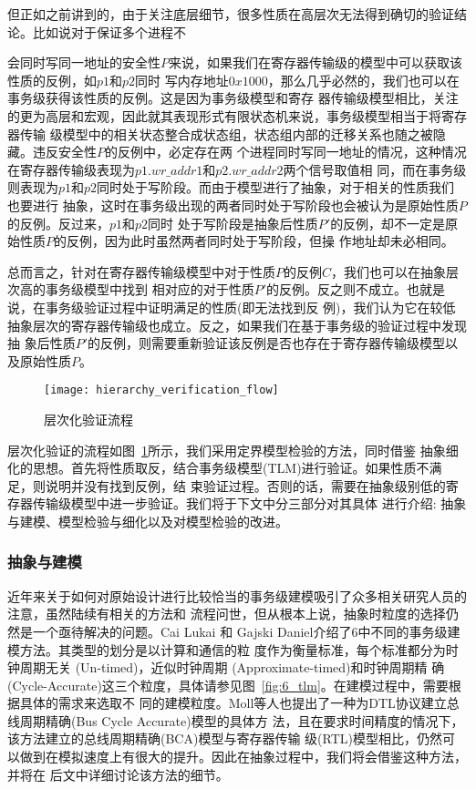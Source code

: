 但正如之前讲到的，由于关注底层细节，很多性质在高层次无法得到确切的验证结论。比如说对于保证多个进程不

 会同时写同一地址的安全性$P$来说，如果我们在寄存器传输级的模型中可以获取该性质的反例，如$p1$和$p2$同时
写内存地址$0x1000$，那么几乎必然的，我们也可以在事务级获得该性质的反例。这是因为事务级模型和寄存
器传输级模型相比，关注的更为高层和宏观，因此就其表现形式有限状态机来说，事务级模型相当于将寄存器传输
级模型中的相关状态整合成状态组，状态组内部的迁移关系也随之被隐藏。违反安全性$P$的反例中，必定存在两
个进程同时写同一地址的情况，这种情况在寄存器传输级表现为$p1.wr\_addr1$和$p2.wr\_addr2$两个信号取值相
同，而在事务级则表现为$p1$和$p2$同时处于写阶段。而由于模型进行了抽象，对于相关的性质我们也要进行
抽象，这时在事务级出现的两者同时处于写阶段也会被认为是原始性质$P$的反例。反过来，$p1$和$p2$同时
处于写阶段是抽象后性质$P'$的反例，却不一定是原始性质$P$的反例，因为此时虽然两者同时处于写阶段，但操
作地址却未必相同。

总而言之，针对在寄存器传输级模型中对于性质$P$的反例$C$，我们也可以在抽象层次高的事务级模型中找到
相对应的对于性质$P'$的反例。反之则不成立。也就是说，在事务级验证过程中证明满足的性质(即无法找到反
例)，我们认为它在较低抽象层次的寄存器传输级也成立。反之，如果我们在基于事务级的验证过程中发现抽
象后性质$P'$的反例，则需要重新验证该反例是否也存在于寄存器传输级模型以及原始性质$P$。

\begin{figure}[ht]
\centering
\texttt{[image: hierarchy\_verification\_flow]}
\caption{层次化验证流程}
\label{fig:hierarchy_verification_flow}
\end{figure} 

层次化验证的流程如图~\ref{fig:hierarchy_verification_flow}所示，我们采用定界模型检验的方法，同时借鉴
抽象细化的思想。首先将性质取反，结合事务级模型(TLM)进行验证。如果性质不满足，则说明并没有找到反例，结
束验证过程。否则的话，需要在抽象级别低的寄存器传输级模型中进一步验证。我们将于下文中分三部分对其具体
进行介绍: 抽象与建模、模型检验与细化以及对模型检验的改进。

\subsubsection{抽象与建模}
\label{sec:abstract-model}

近年来关于如何对原始设计进行比较恰当的事务级建模吸引了众多相关研究人员的注意，虽然陆续有相关的方法和
流程问世，但从根本上说，抽象时粒度的选择仍然是一个亟待解决的问题。Cai Lukai 和 Gajski
Daniel\cite{Cai:2003:TLM:944645.944651}介绍了6中不同的事务级建模方法。其类型的划分是以计算和通信的粒
度作为衡量标准，每个标准都分为时钟周期无关 (Un-timed)，近似时钟周期 (Approximate-timed)和时钟周期精
确 (Cycle-Accurate)这三个粒度，具体请参见图~\ref{fig:6_tlm}。在建模过程中，需要根据具体的需求来选取不
同的建模粒度。Moll等人也提出了一种为DTL协议建立总线周期精确(Bus Cycle Accurate)模型的具体方
法\cite{DATE09_Moll}，且在要求时间精度的情况下，该方法建立的总线周期精确(BCA)模型与寄存器传输
级(RTL)模型相比，仍然可以做到在模拟速度上有很大的提升。因此在抽象过程中，我们将会借鉴这种方法，并将在
后文中详细讨论该方法的细节。

